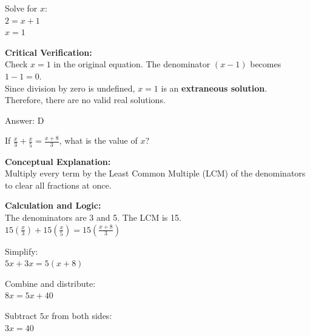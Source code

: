 \documentclass[11pt,paper=a4,answers]{exam}
\begin{document}
\begin{questions}
\begin{solution}
\vspace{15pt}

Solve for $x$: \\
$2 = x + 1$ \\
$x = 1$

\vspace{15pt}

\textbf{Critical Verification:} \\
Check $x = 1$ in the original equation. The denominator $(x-1)$ becomes $1-1=0$. \\
Since division by zero is undefined, $x = 1$ is an \textbf{extraneous solution}. \\
Therefore, there are no valid real solutions.

\vspace{30pt}

Answer: \colorbox{yellow!100}{D}
\end{solution}

\vspace{40pt}

\question
If $\frac{x}{3} + \frac{x}{5} = \frac{x+8}{3}$, what is the value of $x$?

\begin{solution}
\textbf{Conceptual Explanation:} \\
Multiply every term by the Least Common Multiple (LCM) of the denominators to clear all fractions at once.

\vspace{30pt}

\textbf{Calculation and Logic:} \\
The denominators are 3 and 5. The LCM is 15. \\
$15 \left( \frac{x}{3} \right) + 15 \left( \frac{x}{5} \right) = 15 \left( \frac{x+8}{3} \right)$

\vspace{15pt}

Simplify: \\
$5x + 3x = 5(x + 8)$

\vspace{15pt}

Combine and distribute: \\
$8x = 5x + 40$

\vspace{15pt}

Subtract $5x$ from both sides: \\
$3x = 40$


\end{solution}
\end{questions}
\end{document}
